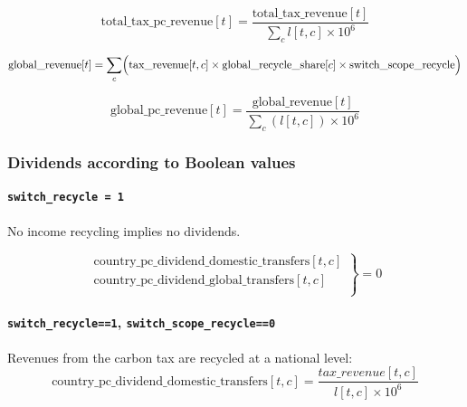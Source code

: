 \documentclass[
]{article}
\begin{document}
\begin{equation}
 \text{total\_tax\_pc\_revenue}[t] = \frac{\text{total\_tax\_revenue}[t]}{\sum_c l[t,c] \times 10^6}
\end{equation}

  \begin{equation}
  \text{global\_revenue}[t] = \sum_c \Bigl( \text{tax\_revenue}[t,c] \times \text{global\_recycle\_share}[c] \times \text{switch\_scope\_recycle} \Bigr)
  \end{equation}

  \begin{equation}
    \text{global\_pc\_revenue}[t] = \frac{\text{global\_revenue}[t]}{\sum_c(l[t,c]) \times 10^6}
  \end{equation}


\subsubsection{Dividends according to Boolean
values}\label{dividends-according-to-boolean-values}

\paragraph{\texorpdfstring{\texttt{switch\_recycle\ =\ 1}}{switch\_recycle = 1}}\label{switch_recycle-1}

No income recycling implies no dividends. 

\begin{equation}
  \left. \begin{array}{l}
  \text{country\_pc\_dividend\_domestic\_transfers}[t,c] \\
  \text{country\_pc\_dividend\_global\_transfers}[t,c] \\
  \end{array} \right\}
  = 0
  \end{equation}

\paragraph{\texorpdfstring{\texttt{switch\_recycle==1},
\texttt{switch\_scope\_recycle==0}}{switch\_recycle==1, switch\_scope\_recycle==0}}\label{switch_recycle1-switch_scope_recycle0}

Revenues from the carbon tax are recycled at a national level:
\begin{equation}
\text{country\_pc\_dividend\_domestic\_transfers}[t,c] = \frac{tax\_revenue[t,c]}{l[t,c] \times 10^6}
\end{equation}
\end{document}
